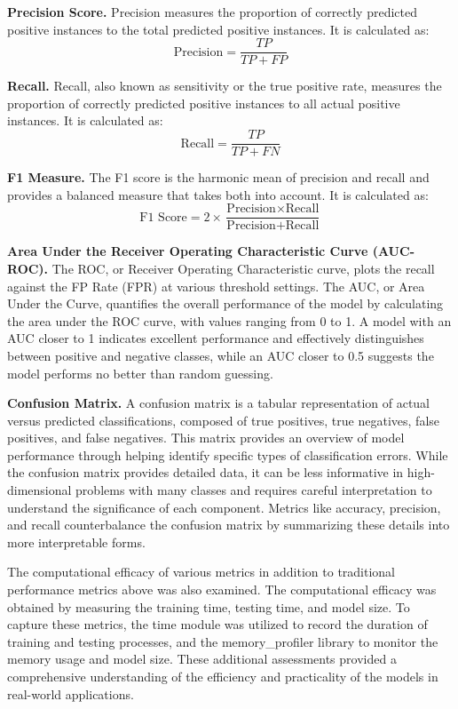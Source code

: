 \documentclass[a4paper,fleqn]{cas-sc}
\begin{document}
\textbf{Precision Score.} Precision measures the proportion of correctly predicted positive instances to the total predicted positive instances. It is calculated as:
\begin{equation}
\text{Precision} = \frac{TP}{TP + FP}
\end{equation}

\textbf{Recall.} Recall, also known as sensitivity or the true positive rate, measures the proportion of correctly predicted positive instances to all actual positive instances. It is calculated as:
\begin{equation}
\text{Recall} = \frac{TP}{TP + FN}
\end{equation}

\textbf{F1 Measure.} The F1 score is the harmonic mean of precision and recall and provides a balanced measure that takes both into account. It is calculated as:
\begin{equation}
\text{F1 Score} = 2 \times \frac{\text{Precision} \times \text{Recall}}{\text{Precision} + \text{Recall}}
\end{equation}

\textbf{Area Under the Receiver Operating Characteristic Curve (AUC-ROC).} The ROC, or Receiver Operating Characteristic curve, plots the recall against the FP Rate (FPR) at various threshold settings. The AUC, or Area Under the Curve, quantifies the overall performance of the model by calculating the area under the ROC curve, with values ranging from 0 to 1. A model with an AUC closer to 1 indicates excellent performance and effectively distinguishes between positive and negative classes, while an AUC closer to 0.5 suggests the model performs no better than random guessing.

\textbf{Confusion Matrix.} A confusion matrix is a tabular representation of actual versus predicted classifications, composed of true positives, true negatives, false positives, and false negatives. This matrix provides an overview of model performance through helping identify specific types of classification errors. While the confusion matrix provides detailed data, it can be less informative in high-dimensional problems with many classes and requires careful interpretation to understand the significance of each component. Metrics like accuracy, precision, and recall counterbalance the confusion matrix by summarizing these details into more interpretable forms.

The computational efficacy of various metrics in addition to traditional performance metrics above was also examined. The computational efficacy was obtained by measuring the training time, testing time, and model size. To capture these metrics, the time module was utilized to record the duration of training and testing processes, and the memory\_profiler library to monitor the memory usage and model size. These additional assessments provided a comprehensive understanding of the efficiency and practicality of the models in real-world applications.
\end{document}
